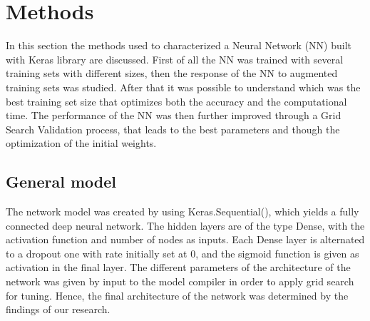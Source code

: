 \documentclass[prl,twocolumn]{revtex4-1}
\begin{document}
 \section{Methods}
In this section the methods used to characterized a Neural Network (NN) built with Keras library are discussed. First of all the NN was trained with several training sets with different sizes, then the response of the NN to augmented training sets was studied. 
After that it was possible to understand which was the best training set size that optimizes both the accuracy and the computational time. The performance of the NN was then further improved through a Grid Search Validation process, that leads to the best parameters and though the optimization of the initial weights.
\subsection{General model}
The network model was created by using Keras.Sequential(), which yields a fully connected deep neural network. The hidden layers are of the type Dense, with the activation function and number of nodes as inputs. Each Dense layer is alternated to a dropout one with rate initially set at 0, and the sigmoid function is given as activation in the final layer. The different parameters of the architecture of the network was given by input to the model compiler in order to apply grid search for tuning. Hence, the final architecture of the network was determined by the findings of our research.
\end{document}
